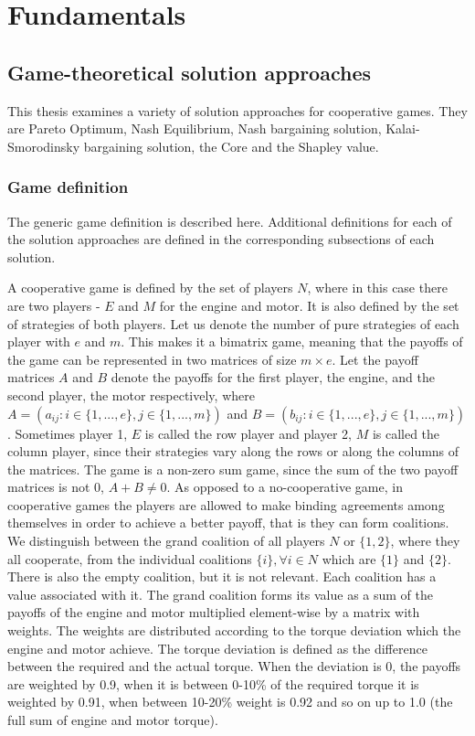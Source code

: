 \chapter{Fundamentals}
\label{chp:basics}

\section{Game-theoretical solution approaches}
This thesis examines a variety of solution approaches for cooperative games. They are Pareto Optimum, Nash Equilibrium, Nash bargaining solution, Kalai-Smorodinsky bargaining solution, the Core and the Shapley value.

\subsection{Game definition}
The generic game definition is described here. Additional definitions for each of the solution approaches are defined in the corresponding subsections of each solution.

A cooperative game is defined by the set of players $N$, where in this case there are two players - $E$ and $M$ for the engine and motor. It is also defined by the set of strategies of both players. Let us denote the number of pure strategies of each player with  $e$ and $m$. This makes it a bimatrix game, meaning that the payoffs of the game can be represented in two matrices of size $m \times e$. Let the payoff matrices $A$ and $B$ denote the payoffs for the first player, the engine, and the second player, the motor respectively, where $A = (a_{ij}: i \in \{1,...,e\}, j \in \{ 1,...,m\})$ and $B = (b_{ij}: i \in \{1,...,e\}, j \in \{ 1,...,m\})$. Sometimes player 1, $E$ is called  the row player and player 2, $M$ is called the column player, since their strategies vary along the rows or along the columns of the matrices. The game is a non-zero sum game, since the sum of the two payoff matrices is not 0, $A + B \neq 0$.
As opposed to a no-cooperative game, in cooperative games the players are allowed to make binding agreements among themselves in order to achieve a better payoff, that is they can form coalitions. We distinguish between the grand coalition of all players $N$ or $\{1,2\}$, where they all cooperate, from the individual coalitions $\{i\}, \forall i \in N$ which are $\{1\}$ and $\{2\}$. There is also the empty coalition, but it is not relevant. Each coalition has a value associated with it. The grand coalition forms its value as a sum of the payoffs of the engine and motor multiplied element-wise by a matrix with weights. The weights are distributed according to the torque deviation which the engine and motor achieve. The torque deviation is defined as the difference between the required and the actual torque. When the deviation is 0, the payoffs are weighted by 0.9, when it is between 0-10\% of the required torque it is weighted by 0.91, when between 10-20\% weight is 0.92 and so on up to 1.0 (the full sum of engine and motor torque).


